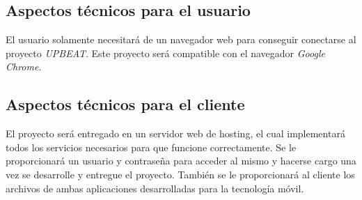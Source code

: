 \documentclass{article}
\begin{document}
\subsection{Aspectos técnicos para el usuario}
El usuario solamente necesitará de un navegador web para conseguir conectarse al proyecto \textit{UPBEAT}.
Este proyecto será compatible con el navegador \textit{Google Chrome}.\vspace{0.5cm}
\hfill\break
\begin{figure}[H]
\end{figure}

\subsection{Aspectos técnicos para el cliente}
El proyecto será entregado en un servidor web de hosting, el cual implementará todos los servicios necesarios para que funcione correctamente. Se le proporcionará un usuario y contraseña para acceder al mismo y hacerse cargo una vez se desarrolle y entregue el proyecto.
\hfill \break
También se le proporcionará al cliente los archivos de ambas aplicaciones desarrolladas para la tecnología móvil.
\begin{figure}[H]
\end{figure}
\end{document}
